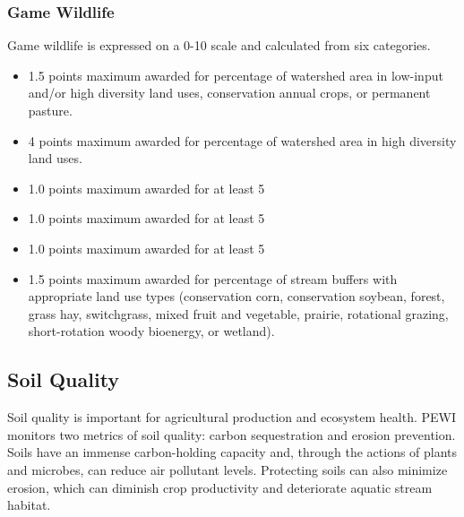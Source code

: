 \documentclass[11pt]{article}
\begin{document}
\subsubsection{Game Wildlife}
Game wildlife is expressed on a 0-10 scale and calculated from six categories. 
\begin{itemize}
\item 1.5 points maximum awarded for percentage of watershed area in low-input and/or high diversity land uses, conservation annual crops, or permanent pasture. 
\item 4 points maximum awarded for percentage of watershed area in high diversity land uses. 
\item 1.0 points maximum awarded for at least 5%
\item 1.0 points maximum awarded for at least 5%
\item 1.0 points maximum awarded for at least 5%
\item 1.5 points maximum awarded for percentage of stream buffers with appropriate land use types (conservation corn, conservation soybean, forest, grass hay, switchgrass, mixed fruit and vegetable, prairie, rotational grazing, short-rotation woody bioenergy, or wetland).
\end{itemize}
  
\subsection{Soil Quality}
 Soil quality is important for agricultural production and ecosystem health. PEWI monitors two metrics of soil quality: carbon sequestration and erosion prevention. Soils have an immense carbon-holding capacity and, through the actions of plants and microbes, can reduce air pollutant levels. Protecting soils can also minimize erosion, which can diminish crop productivity and deteriorate aquatic stream habitat.\cite{36} 
 
 \newpage
\end{document}
